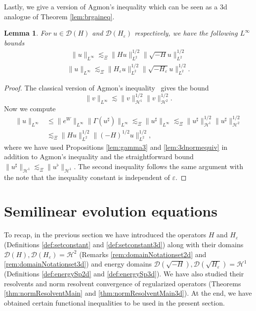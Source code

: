 \documentclass[11pt, oneside]{article}   	%
\newtheorem{lemma}[theorem]{Lemma}
\newcommand{\ED}{\mathscr{D} ( \sqrt{-H})}
\newcommand{\ssp}{\mathscr{H}}
\begin{document}
Lastly, we give a version of Agmon's inequality which can be seen as a 3d analogue of Theorem \ref{lem:brgaineq}.
\begin{lemma}\label{lem:3dagmon}
	For $u\in \mathscr{D}(H)$ and $\mathscr{D}(H_\varepsilon)$ respectively,   we have the following $L^\infty$ bounds
	\begin{align*}
	\|u\|_{L^\infty}\lesssim_\Xi \|{H} u\|^{1/2}_{L^2}\|\sqrt{-{H}}u\|^{1/2}_{L^2}
	\end{align*}
		\begin{align*}
	\|u\|_{L^\infty}\lesssim_\Xi \|{H_\varepsilon} u\|^{1/2}_{L^2}\|\sqrt{-{H_\varepsilon}}u\|^{1/2}_{L^2}.
	\end{align*}
\end{lemma}
\begin{proof}
	The classical version of Agmon's inequality~\cite{Ag65} gives the bound\[
	\|v\|_{L^\infty}\lesssim\|v\|^{1/2}_{\ssp^1}\|v\|^{1/2}_{\ssp^2}.
	\]
	Now we compute
	\begin{align*}
	\|u\|_{L^\infty}&\le \|e^W\|_{L^\infty}\|\Gamma(u^\sharp)\|_{L^\infty}
	\lesssim_\Xi \|u^\sharp\|_{L^\infty}
	\lesssim_\Xi \|u^\sharp\|^{1/2}_{\ssp^1}\|u^\sharp\|^{1/2}_{\ssp^2}\\
	&\lesssim_\Xi \|{H} u\|^{1/2}_{L^2}\|(-{H})^{1/2}u\|^{1/2}_{L^2},
	\end{align*}
	where we have used Propositions \ref{lem:gamma3} and \ref{lem:3dnormequiv} in addition to Agmon's inequality and the straightforward bound $\|u^\sharp\|_{\ssp^1}\lesssim_\Xi\|u^\flat\|_{\ssp^1}.$  The second inequality follows the same argument with the note that the inequality constant is independent of $\varepsilon$.
\end{proof}
				










\section{Semilinear evolution equations } \label{sec:section3}
To recap, in the previous section we have introduced the operators $H$ and $H_\varepsilon$ (Definitions \ref{def:setconstant} and \ref{def:setconstant3d}) along with their domains $\mathscr{D}(H), \mathscr{D}(H_\varepsilon) = \mathscr{H}^2 $ (Remarks \ref{rem:domainNotationset2d} and \ref{rem:domainNotationset3d}) and energy domains $\ED, \mathscr{D}(\sqrt{H_\varepsilon}) = \mathscr{H}^1$ (Definitions \ref{def:energySp2d} and \ref{def:energySp3d}).  We have also studied their resolvents and norm resolvent convergence of regularized operators (Theorems \ref{thm:normResolventMain} and \ref{thm:normResolventMain3d}).  At the end, we have  obtained certain functional inequalities to be used in the present section.
\end{document}

